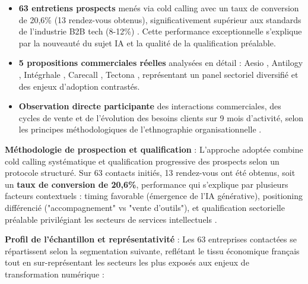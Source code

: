 \begin{itemize}
    \item \textbf{63 entretiens prospects} \cite{luwai2025meetings} menés via cold calling avec un taux de conversion de 20,6\% (13 rendez-vous obtenus), significativement supérieur aux standards de l'industrie B2B tech (8-12\%) \cite{salesforce2024conversion}. Cette performance exceptionnelle s'explique par la nouveauté du sujet IA et la qualité de la qualification préalable.
    \item \textbf{5 propositions commerciales réelles} analysées en détail : Aesio \cite{luwai2025aesio}, Antilogy \cite{luwai2025antilogy}, Intégrhale \cite{luwai2025integrhale}, Carecall \cite{luwai2025carecall}, Tectona \cite{luwai2025tectona}, représentant un panel sectoriel diversifié et des enjeux d'adoption contrastés.
    \item \textbf{Observation directe participante} des interactions commerciales, des cycles de vente et de l'évolution des besoins clients sur 9 mois d'activité, selon les principes méthodologiques de l'ethnographie organisationnelle \cite{yanow2012interpretive}.
\end{itemize}

\textbf{Méthodologie de prospection et qualification} : L'approche adoptée combine cold calling systématique et qualification progressive des prospects selon un protocole structuré. Sur 63 contacts initiés, 13 rendez-vous ont été obtenus, soit un \textbf{taux de conversion de 20,6\%}, performance qui s'explique par plusieurs facteurs contextuels : timing favorable (émergence de l'IA générative), positioning différencié ("accompagnement" vs "vente d'outils"), et qualification sectorielle préalable privilégiant les secteurs de services intellectuels \cite{kotler2017marketing}.

\textbf{Profil de l'échantillon et représentativité} : Les 63 entreprises contactées se répartissent selon la segmentation suivante, reflétant le tissu économique français tout en sur-représentant les secteurs les plus exposés aux enjeux de transformation numérique \cite{insee2024pme} :

